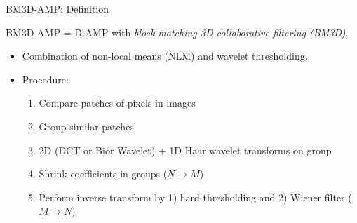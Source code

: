 \documentclass{beamer}
\begin{document}

  \begin{frame}{BM3D-AMP: Definition}
  \footnotesize{
    BM3D-AMP = D-AMP with \emph{block matching 3D collaborative filtering (BM3D)}.
    \begin{itemize}
      \item Combination of non-local means (NLM) and wavelet thresholding.
      \item Procedure:
      \begin{enumerate}
        \item Compare patches of pixels in images
        \item Group similar patches
        \item 2D (DCT or Bior Wavelet) + 1D Haar wavelet transforms on group
        \item Shrink coefficients in groups ($N \to M$)
        \item Perform inverse transform by 1) hard thresholding and 2) Wiener filter ($M\to N$)
      \end{enumerate}
    \end{itemize}
    }
  \end{frame}
\end{document}
